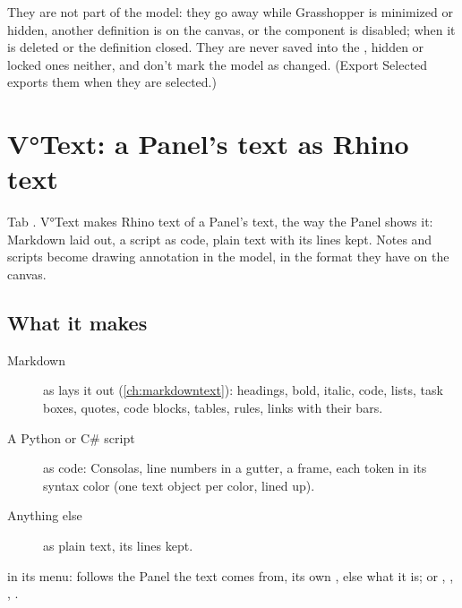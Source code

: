 \begin{note}
They are not part of the model: they go away while Grasshopper is minimized or hidden, another definition is on
the canvas, or the component is disabled; when it is deleted or the definition closed. They are never saved into
the , hidden or locked ones neither, and don't mark the model as changed. (Export Selected exports them
when they are selected.)
\end{note}

\section{V°Text: a Panel's text as Rhino text}\label{sec:vtext}

Tab . V°Text makes Rhino text of a Panel's text, the way the Panel shows it: Markdown laid
out, a script as code, plain text with its lines kept. Notes and scripts become drawing annotation in the model, in
the format they have on the canvas.


\subsection{What it makes}

\begin{description}
  \item[Markdown] as  lays it out (\cref{ch:markdowntext}): headings, bold, italic, code, lists, task
        boxes, quotes, code blocks, tables, rules, links with their bars.
  \item[A Python or C\# script] as code: Consolas, line numbers in a gutter, a frame, each token in its syntax color (one
        text object per color, lined up).
  \item[Anything else] as plain text, its lines kept.
\end{description}

 in its menu:  follows the Panel the text comes from, its own
, else what it is; or , , , .

